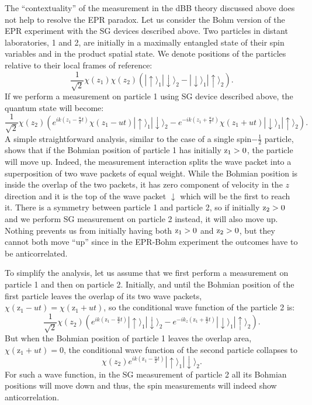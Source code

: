 \documentclass[12pt,preprint,tightenlines]{elsarticle}
\begin{document}
The ``contextuality'' of the measurement in the dBB theory discussed
above does not help to resolve the EPR paradox. Let us consider the
Bohm version of the EPR experiment with the SG devices
described above. Two particles in distant
laboratories, 1 and 2, are  initially in a maximally entangled state of their
spin variables and  in the product spatial state. We denote positions of the particles relative to their local frames
of reference:
 \begin{equation}
\frac{1}{\sqrt{2}}\chi(z_{1})\chi(z_{2})(|\uparrow\rangle_{1}|\downarrow\rangle_{2}-|\downarrow\rangle_{1}|\uparrow\rangle_{2}).
\end{equation}
 If we perform a measurement on particle 1 using SG device
described above, the quantum state will become:
 \begin{equation}
\frac{1}{\sqrt{2}}\chi(z_{2})\left(e^{ik(z_{1}-\frac{u}{2}t)}\chi(z_{1}-ut)|\uparrow\rangle_{1}|\downarrow\rangle_{2}-e^{-ik(z_{1}
+\frac{u}{2}t)}\chi(z_{1}+ut)|\downarrow\rangle_{1}|\uparrow\rangle_{2}\right).
\end{equation}
A simple straightforward analysis, similar to the case of a single
spin$-\frac{1}{2}$ particle, shows that if the Bohmian position of
particle 1 has initially ${\rm z}_{1}>0$, the particle will move
up. Indeed, the measurement interaction splits the wave packet into
a superposition of two wave packets of equal weight. While the Bohmian
position is inside the overlap of the two packets, it has zero component
of velocity in the $z$ direction and it is the top of the wave packet  $\downarrow$
which will be the first to reach it. There is a symmetry between particle
1 and particle 2, so if initially ${\rm z}_{2}>0$ and we perform
SG measurement on particle 2 instead, it will also move
up. Nothing prevents us from initially having both ${\rm z}_{1}>0$
and ${\rm z}_{2}>0$, but they cannot both move ``up'' since in
the EPR-Bohm experiment the outcomes have to be anticorrelated.

To simplify the analysis, let us assume that we first perform a measurement
on particle 1 and then on particle 2. Initially, and until the Bohmian
position of the first particle leaves the overlap of its two wave
packets, $\chi({\text{z}}_{1}-ut)=\chi({\text{z}}_{1}+ut)$, so the
conditional wave function of the particle 2 is:
\begin{equation}
\frac{1}{\sqrt{2}}\chi(z_{2})\left(e^{ik({\text{z}}_{1}-\frac{u}{2}t)}|\uparrow\rangle_{1}|\downarrow\rangle_{2}-e^{-ik_{z}({\text{z}}_{1}
+\frac{u}{2}t)}|\downarrow\rangle_{1}|\uparrow\rangle_{2}\right).
\end{equation}
 But when the Bohmian position of particle 1 leaves the overlap area,
$\chi({\text{z}}_{1}+ut)=0$, the conditional wave function of the
second particle collapses to
\begin{equation}
\chi(z_{2}) e^{ik({\text{z}}_{1}-\frac{u}{2}t)}|\uparrow\rangle_{1}|\downarrow\rangle_{2}.
\end{equation}
 For such a wave function, in the SG measurement of particle 2 all its Bohmian positions  will
move down and thus, the spin measurements will indeed show anticorrelation.
\end{document}
